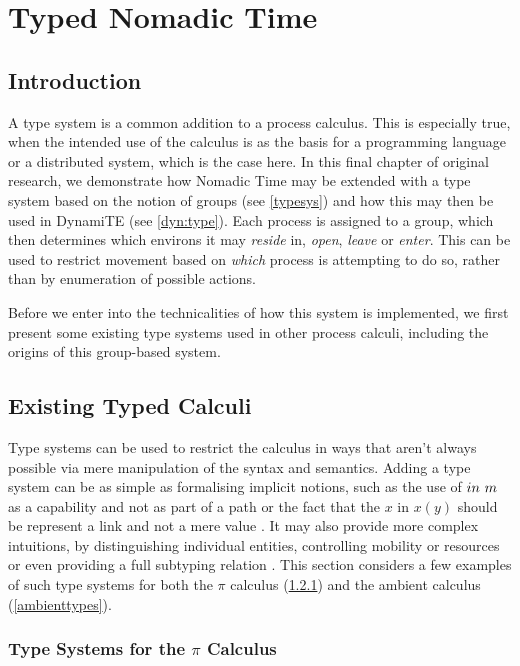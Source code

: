 
\chapter{Typed Nomadic Time}
\label{tnt}

\section{Introduction}

A type system is a common addition to a process calculus.  This is
especially true, when the intended use of the calculus is as the basis
for a programming language or a distributed system, which is the case
here.  In this final chapter of original research, we demonstrate how
Nomadic Time may be extended with a type system based on the notion of
groups (see \ref{typesys}) and how this may then be used in DynamiTE
(see \ref{dyn:type}).  Each process is assigned to a group, which then
determines which environs it may \emph{reside} in, \emph{open},
\emph{leave} or \emph{enter}.  This can be used to restrict movement
based on \emph{which} process is attempting to do so, rather than by
enumeration of possible actions.

Before we enter into the technicalities of how this system is
implemented, we first present some existing type systems used in other
process calculi, including the origins of this group-based system.

\section{Existing Typed Calculi}
\label{typedcalculi}

Type systems can be used to restrict the calculus in ways that aren't
always possible via mere manipulation of the syntax and semantics.
Adding a type system can be as simple as formalising implicit notions,
such as the use of $in\ m$ as a capability and not as part of a
path \cite{ambienttypes} or the fact that the $x$ in $x(y)$ should be
represent a link and not a mere value \cite{sangiorgi:types-or}.  It
may also provide more complex intuitions, by distinguishing individual
entities, controlling mobility
\cite{ambienttypes,sangiorgi:mobsafeambients} or resources
\cite{hennessy:dpi98} or even providing a full subtyping relation
\cite{sangiorgi:typing,boxedamb02}.  This section considers a few
examples of such type systems for both the $\pi$ calculus
(\ref{pitypes}) and the ambient calculus
(\ref{ambienttypes}).\subsection{Type Systems for the $\pi$ Calculus}
\label{pitypes}

